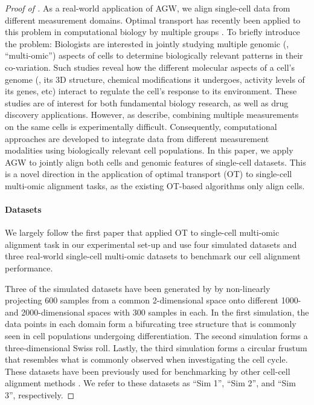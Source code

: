 \begin{proof}[Proof of ]
As a real-world application of AGW, we align single-cell data from different measurement domains.
Optimal transport has recently been applied to this problem in computational biology by
multiple groups \citep{Demetci20, Pamona, UniPort}. To briefly introduce the problem:
Biologists are interested in jointly studying multiple genomic (\ie, ``multi-omic'')
aspects of cells to determine biologically relevant patterns in their co-variation.
Such studies reveal how the different molecular aspects of a cell's genome (\eg,
its 3D structure, chemical modifications it undergoes, activity levels of its genes, etc)
interact to regulate the cell's response to its environment. These studies are of interest
for both fundamental biology research, as well as drug discovery applications. However,
as \citep{liu_et_al:LIPIcs:2019:11040} describe, combining multiple measurements on the
same cells is experimentally difficult. Consequently, computational approaches are developed
to integrate data from different measurement modalities using biologically relevant cell populations.
In this paper, we apply AGW to jointly align both cells and genomic features of single-cell datasets.
This is a novel direction in the application of optimal transport (OT) to
single-cell multi-omic alignment tasks, as the existing OT-based algorithms only align cells.

\paragraph{Datasets} We largely follow the first paper that applied OT to
single-cell multi-omic alignment task \citep{Demetci20} in our experimental set-up and
use four simulated datasets and three real-world single-cell multi-omic datasets to benchmark
our cell alignment performance.

Three of the simulated datasets have been generated by
\citep{liu_et_al:LIPIcs:2019:11040} by non-linearly projecting 600 samples from a common
2-dimensional space onto different 1000- and 2000-dimensional spaces with 300 samples in each.
In the first simulation, the data points in each domain form a bifurcating tree structure
that is commonly seen in cell populations undergoing differentiation. The second simulation
forms a three-dimensional Swiss roll. Lastly, the third simulation forms a circular frustum
that resembles what is commonly observed when investigating the cell cycle.
These datasets have been previously used for benchmarking by other cell-cell alignment methods
\citep{liu_et_al:LIPIcs:2019:11040,singh20,cao2020unsupervised, Pamona,Demetci20}.
We refer to these datasets as ``Sim 1'', ``Sim 2'', and ``Sim 3'', respectively.


\end{proof}
